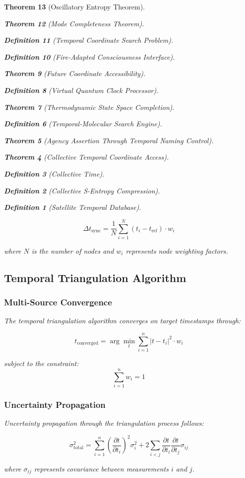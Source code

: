 \documentclass[12pt,a4paper]{article}
\newtheorem{theorem}{Theorem}[section]
\newtheorem{definition}[theorem]{Definition}
\begin{document}
\begin{theorem}[Oscillatory Entropy Theorem]
\begin{theorem}[Mode Completeness Theorem]
\begin{enumerate}
\begin{definition}[Temporal Coordinate Search Problem]
\begin{algorithm}
\begin{definition}[Fire-Adapted Consciousness Interface]
\begin{theorem}[Future Coordinate Accessibility]
\begin{definition}[Virtual Quantum Clock Processor]
\begin{itemize}
\begin{itemize}
\begin{theorem}[Thermodynamic State Space Completion]
\begin{definition}[Temporal-Molecular Search Engine]
\begin{theorem}[Agency Assertion Through Temporal Naming Control]
\begin{remark}
\begin{theorem}[Collective Temporal Coordinate Access]
\begin{definition}[Collective Time]
\begin{definition}[Collective S-Entropy Compression]
\begin{definition}[Satellite Temporal Database]
\begin{algorithm}
\begin{table}[h]
{{\begin{equation}
\Delta t_{\text{sync}} = \frac{1}{N} \sum_{i=1}^{N} (t_i - t_{\text{ref}}) \cdot w_i
\end{equation}

where $N$ is the number of nodes and $w_i$ represents node weighting factors.

\subsection{Temporal Triangulation Algorithm}

\subsubsection{Multi-Source Convergence}

The temporal triangulation algorithm converges on target timestamps through:

\begin{equation}
t_{\text{converged}} = \arg\min_t \sum_{i=1}^{n} |t - t_i|^2 \cdot w_i
\end{equation}

subject to the constraint:
\begin{equation}
\sum_{i=1}^{n} w_i = 1
\end{equation}

\subsubsection{Uncertainty Propagation}

Uncertainty propagation through the triangulation process follows:

\begin{equation}
\sigma_{\text{total}}^2 = \sum_{i=1}^{n} \left(\frac{\partial t}{\partial t_i}\right)^2 \sigma_i^2 + 2\sum_{i<j} \frac{\partial t}{\partial t_i} \frac{\partial t}{\partial t_j} \sigma_{ij}
\end{equation}

where $\sigma_{ij}$ represents covariance between measurements $i$ and $j$.

}}
\end{table}
\end{algorithm}
\end{definition}
\end{definition}
\end{definition}
\end{theorem}
\end{remark}
\end{theorem}
\end{definition}
\end{theorem}
\end{itemize}
\end{itemize}
\end{definition}
\end{theorem}
\end{definition}
\end{algorithm}
\end{definition}
\end{enumerate}
\end{theorem}
\end{theorem}
\end{document}
